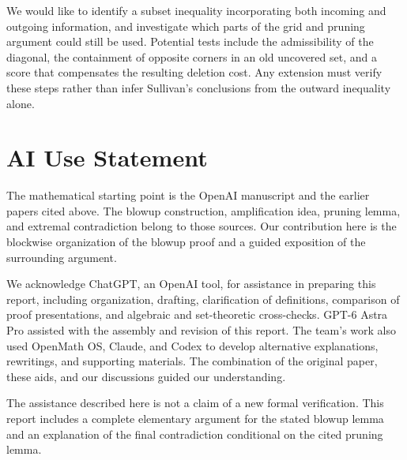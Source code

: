 \documentclass[11pt]{article}
\begin{document}
We would like to identify a subset inequality incorporating both
incoming and outgoing information, and investigate which parts of
the grid and pruning argument could still be used. Potential tests
include the admissibility of the diagonal, the containment of opposite
corners in an old uncovered set, and a score that compensates the
resulting deletion cost. Any extension must verify these steps rather
than infer Sullivan's conclusions from the outward inequality alone.

\section*{AI Use Statement}
The mathematical starting point is the OpenAI manuscript
\cite{openai} and the earlier papers cited above. The blowup
construction, amplification idea, pruning lemma, and extremal
contradiction belong to those sources. Our contribution here is the
blockwise organization of the blowup proof and a guided exposition
of the surrounding argument.

We acknowledge ChatGPT, an OpenAI tool, for assistance in preparing
this report, including organization, drafting, clarification of
definitions, comparison of proof presentations, and algebraic and
set-theoretic cross-checks. GPT-6 Astra Pro assisted with the assembly
and revision of this report. The team's work also used OpenMath OS,
Claude, and Codex to develop alternative explanations, rewritings,
and supporting materials. The combination of the original paper,
these aids, and our discussions guided our understanding.

The assistance described here is not a claim of a new formal
verification. This report includes a complete elementary argument
for the stated blowup lemma and an explanation of the final
contradiction conditional on the cited pruning lemma. 
\end{document}
